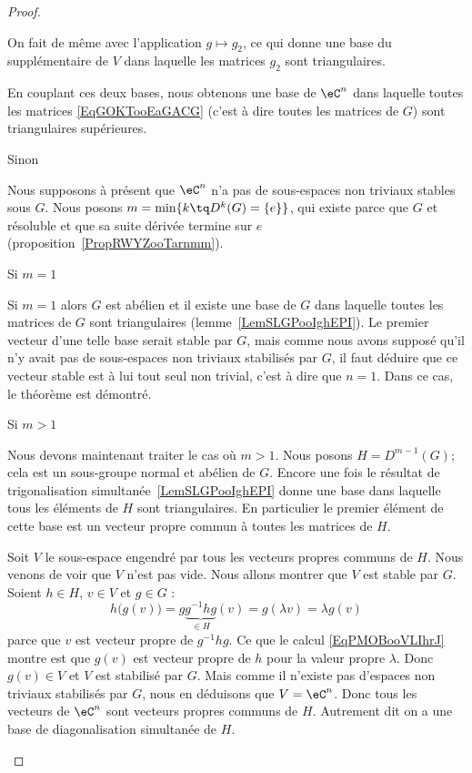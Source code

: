 \begin{proof}
\begin{subproof}
    On fait de même avec l'application \( g\mapsto g_2\), ce qui donne une base du supplémentaire de \( V\) dans laquelle les matrices \( g_2\) sont triangulaires.

    En couplant ces deux bases, nous obtenons une base de \( \eC^n\) dans laquelle toutes les matrices \eqref{EqGOKTooEaGACG} (c'est à dire toutes les matrices de \( G\)) sont triangulaires supérieures.

    \item[Sinon]

    Nous supposons à présent que \( \eC^n\) n'a pas de sous-espaces non triviaux stables sous \( G\). Nous posons \( m=\min\{ k\tq D^k(G)=\{ e \} \}\), qui existe parce que \( G\) et résoluble et que sa suite dérivée termine sur \( {e}\) (proposition~\ref{PropRWYZooTarnmm}).

\item[Si \( m=1\)]

    Si \( m=1\) alors \( G\) est abélien et il existe une base de \( G\) dans laquelle toutes les matrices de \( G\) sont triangulaires (lemme~\ref{LemSLGPooIghEPI}). Le premier vecteur d'une telle base serait stable par \( G\), mais comme nous avons supposé qu'il n'y avait pas de sous-espaces non triviaux stabilisés par \( G\), il faut déduire que ce vecteur stable est à lui tout seul non trivial, c'est à dire que \( n=1\). Dans ce cas, le théorème est démontré.

\item[Si \( m>1\)]

    Nous devons maintenant traiter le cas où \( m>1\). Nous posons \( H=D^{m-1}(G)\); cela est un sous-groupe normal et abélien de \( G\). Encore une fois le résultat de trigonalisation simultanée~\ref{LemSLGPooIghEPI} donne une base dans laquelle tous les éléments de \( H\) sont triangulaires. En particulier le premier élément de cette base est un vecteur propre commun à toutes les matrices de \( H\).

    Soit \( V\) le sous-espace engendré par tous les vecteurs propres communs de \( H\). Nous venons de voir que \( V\) n'est pas vide. Nous allons montrer que \( V\) est stable par \( G\). Soient \( h\in H\), \( v\in V\) et \( g\in G\) :
    \begin{equation}    \label{EqPMOBooVLIhrJ}
        h\big( g(v) \big)=g\underbrace{g^{-1}hg}_{\in H}(v)=g(\lambda v)=\lambda g(v)
    \end{equation}
    parce que \( v\) est vecteur propre de \( g^{-1} hg\). Ce que le calcul \eqref{EqPMOBooVLIhrJ} montre est que \( g(v)\) est vecteur propre de \( h\) pour la valeur propre \( \lambda\). Donc \( g(v)\in V\) et \( V\) est stabilisé par \( G\). Mais comme il n'existe pas d'espaces non triviaux stabilisés par \( G\), nous en déduisons que \( V=\eC^n\). Donc tous les vecteurs de \( \eC^n\) sont vecteurs propres communs de \( H\). Autrement dit on a une base de diagonalisation simultanée de \( H\).


\end{subproof}
\end{proof}
